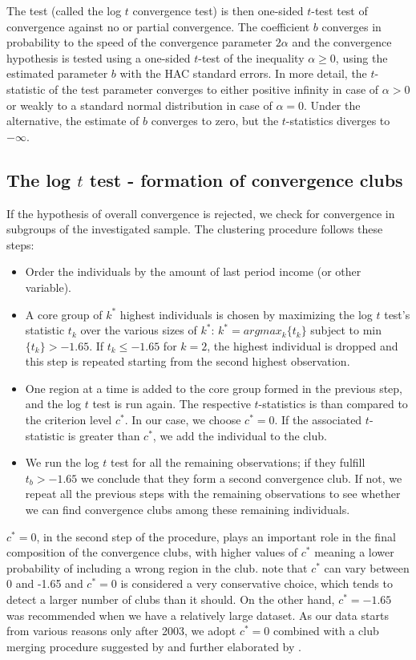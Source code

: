 \documentclass[11pt]{article}
\begin{document}
The test (called the log $t$ convergence test) is then one-sided $t$-test test of convergence against no or partial convergence. The coefficient $b$ converges in probability to the speed of the convergence parameter $2\alpha$ and the convergence hypothesis is tested using a one-sided $t$-test of the inequality \(\alpha \geq 0 \), using the estimated parameter $b$ with the HAC standard errors. In more detail, the $t$-statistic of the test parameter converges to either positive infinity in case of \(\alpha > 0 \) or weakly to a standard normal distribution in case of \(\alpha = 0\). Under the alternative, the estimate of $b$ converges to zero, but the $t$-statistics diverges to $-\infty$.



\subsection{The log $t$ test - formation of convergence clubs }
If the hypothesis of overall convergence is rejected, we check for convergence in subgroups of the investigated sample. The clustering procedure follows these steps:
\begin{itemize}
    \item Order the individuals by the amount of last period income (or other variable).
    \item  A core group of $k^{*}$ highest individuals is chosen by maximizing the log $t$ test's statistic $t_{k}$ over the various sizes of $k^{*}$:
    \(k^{*} = arg max_{k}\{t_{k}\}\) subject to min \( \{t_{k}\}> -1.65\). If \(t_{k} \leq -1.65 \) for \(k=2\), the highest individual is dropped and this step is repeated starting from the second highest observation. 
    \item One region at a time is added to the core group formed in the previous step, and the log $t$ test is run again. The respective  $t$-statistics is than compared to the criterion level $c^{*}$. In our case, we choose $c^{*}=0$. If the associated $t$-statistic is greater than  $c^{*}$, we add the individual to the club.
    \item We run the log $t$ test for all the remaining observations; if they fulfill \(t_b > -1.65\) we conclude that they form a second convergence club. If not, we repeat all the previous steps with the remaining observations to see whether we can find convergence clubs among these remaining individuals.
\end{itemize}    

 \(c^{*} = 0\), in the second step of the procedure, plays an important role in the final composition of the convergence clubs, with higher values of $c^*$ meaning a lower probability of including a wrong region in the club. \citet{phillips2009economic} note that $c^{*}$ can vary between 0 and -1.65 and $c^{*}=0$ is considered a very conservative choice, which tends to detect a larger number of clubs than it should. On the other hand, $c^{*}=-1.65$ was recommended when we have a relatively large dataset. As our data starts from various reasons only after 2003, we adopt $c^*= 0$ combined with a club merging procedure suggested by \citet{phillips2009economic} and further elaborated by \citet{bartkowska2012regional}. 
\end{document}
